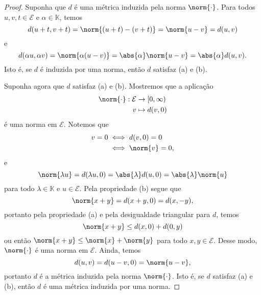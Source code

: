\begin{proof}
    Suponha que \(d\) é uma métrica induzida pela norma \(\norm{\cdot}\). Para todos \(u,v,t\in\mathcal{E}\) e \(\alpha \in \mathbb{K}\), temos
    \begin{equation*}
        d(u + t, v + t) = \norm{(u+t) - (v + t)} = \norm{u - v} = d(u,v)
    \end{equation*}
    e
    \begin{equation*}
        d(\alpha u, \alpha v) = \norm{\alpha (u - v)} = \abs{\alpha} \norm{u-v} = \abs{\alpha} d(u,v).
    \end{equation*}
    Isto é, se \(d\) é induzida por uma norma, então \(d\) satisfaz (a) e (b).

    Suponha agora que \(d\) satisfaz (a) e (b). Mostremos que a aplicação
    \begin{align*}
        \norm{\cdot} : \mathcal{E} &\to [0, \infty)\\
                                 v &\mapsto d(v, 0)
    \end{align*}
    é uma norma em \(\mathcal{E}\). Notemos que
    \begin{align*}
        v = 0 &\iff d(v, 0) = 0\\
              &\iff \norm{v} = 0,
    \end{align*}
    e
    \begin{equation*}
        \norm{\lambda u} = d(\lambda u, 0) = \abs{\lambda} d(u,0) = \abs{\lambda}\norm{u}
    \end{equation*}
    para todo \(\lambda \in \mathbb{K}\) e \(u \in \mathcal{E}\). Pela propriedade (b) segue que
    \begin{equation*}
        \norm{x + y} = d(x + y, 0) = d(x, -y),
    \end{equation*}
    portanto pela propriedade (a) e pela desigualdade triangular para \(d\), temos
    \begin{equation*}
        \norm{x+y} \leq d(x, 0) + d(0, y)
    \end{equation*}
    ou então \(\norm{x+y} \leq \norm{x} + \norm{y}\) para todo \(x,y\in\mathcal{E}\). Desse modo, \(\norm{\cdot}\) é uma norma em \(\mathcal{E}\). Ainda, temos
    \begin{equation*}
        d(u, v) = d(u-v, 0) = \norm{u - v},
    \end{equation*}
    portanto \(d\) é a métrica induzida pela norma \(\norm{\cdot}\). Isto é, se \(d\) satisfaz (a) e (b), então \(d\) é uma métrica induzida por uma norma.
\end{proof}
